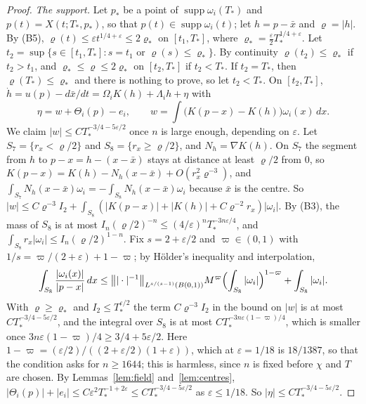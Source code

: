 \documentclass[11pt]{article}
\theoremstyle{definition}
\begin{document}
\begin{proof}
\emph{The support.} Let $p_*$ be a point of $\operatorname{supp}\omega_i(T_*)$ and $p(t) = X(t; T_*, p_*)$, so that $p(t) \in \operatorname{supp}\omega_i(t)$; let $h = p - \bar x$ and $\varrho = |h|$. By (B5), $\varrho(t) \le \varepsilon t^{1/4+\varepsilon} \le 2\varrho_*$ on $[t_1, T_*]$, where $\varrho_* = \frac\varepsilon2T_*^{1/4+\varepsilon}$. Let $t_2 = \sup\{s \in [t_1, T_*] : s = t_1 \text{ or } \varrho(s) \le \varrho_*\}$. By continuity $\varrho(t_2) \le \varrho_*$ if $t_2 > t_1$, and $\varrho_* \le \varrho \le 2\varrho_*$ on $[t_2, T_*]$ if $t_2 < T_*$. If $t_2 = T_*$, then $\varrho(T_*) \le \varrho_*$ and there is nothing to prove, so let $t_2 < T_*$. On $[t_2, T_*]$, $\dot h = u(p) - d\bar x/dt = \Omega_iK(h) + \Lambda_ih + \eta$ with
\[
  \eta = w + \Theta_i(p) - e_i,\qquad w = \int\bigl(K(p - x) - K(h)\bigr)\omega_i(x)\,dx.
\]
We claim $|w| \le CT_*^{-3/4-5\varepsilon/2}$ once $n$ is large enough, depending on $\varepsilon$. Let $S_7 = \{r_x < \varrho/2\}$ and $S_8 = \{r_x \ge \varrho/2\}$, and $N_h = \nabla K(h)$. On $S_7$ the segment from $h$ to $p - x = h - (x - \bar x)$ stays at distance at least $\varrho/2$ from $0$, so $K(p - x) = K(h) - N_h(x - \bar x) + O(r_x^2\varrho^{-3})$, and $\int_{S_7}N_h(x - \bar x)\omega_i = -\int_{S_8}N_h(x - \bar x)\omega_i$ because $\bar x$ is the centre. So $|w| \le C\varrho^{-3}I_2 + \int_{S_8}(|K(p - x)| + |K(h)| + C\varrho^{-2}r_x)|\omega_i|$. By (B3), the mass of $S_8$ is at most $I_n(\varrho/2)^{-n} \le (4/\varepsilon)^nT_*^{-3n\varepsilon/4}$, and $\int_{S_8}r_x|\omega_i| \le I_n(\varrho/2)^{1-n}$. Fix $s = 2 + \varepsilon/2$ and $\varpi \in (0, 1)$ with $1/s = \varpi/(2+\varepsilon) + 1 - \varpi$; by H\"older's inequality and interpolation,
\[
  \int_{S_8}\frac{|\omega_i(x)|}{|p - x|}\,dx \le \bigl\||\cdot|^{-1}\bigr\|_{L^{s/(s-1)}(B(0,1))}M^\varpi\Bigl(\int_{S_8}|\omega_i|\Bigr)^{1-\varpi} + \int_{S_8}|\omega_i|.
\]
With $\varrho \ge \varrho_*$ and $I_2 \le T_*^{\varepsilon/2}$ the term $C\varrho^{-3}I_2$ in the bound on $|w|$ is at most $CT_*^{-3/4-5\varepsilon/2}$, and the integral over $S_8$ is at most $CT_*^{-3n\varepsilon(1-\varpi)/4}$, which is smaller once $3n\varepsilon(1-\varpi)/4 \ge 3/4 + 5\varepsilon/2$. Here $1 - \varpi = (\varepsilon/2)/((2 + \varepsilon/2)(1 + \varepsilon))$, which at $\varepsilon = 1/18$ is $18/1387$, so that the condition asks for $n \ge 1644$; this is harmless, since $n$ is fixed before $\chi$ and $T$ are chosen. By Lemmas~\ref{lem:field} and~\ref{lem:centres}, $|\Theta_i(p)| + |e_i| \le C\varepsilon^2T_*^{-1+2\varepsilon} \le CT_*^{-3/4-5\varepsilon/2}$ as $\varepsilon \le 1/18$. So $|\eta| \le CT_*^{-3/4-5\varepsilon/2}$.


\end{proof}
\end{document}
